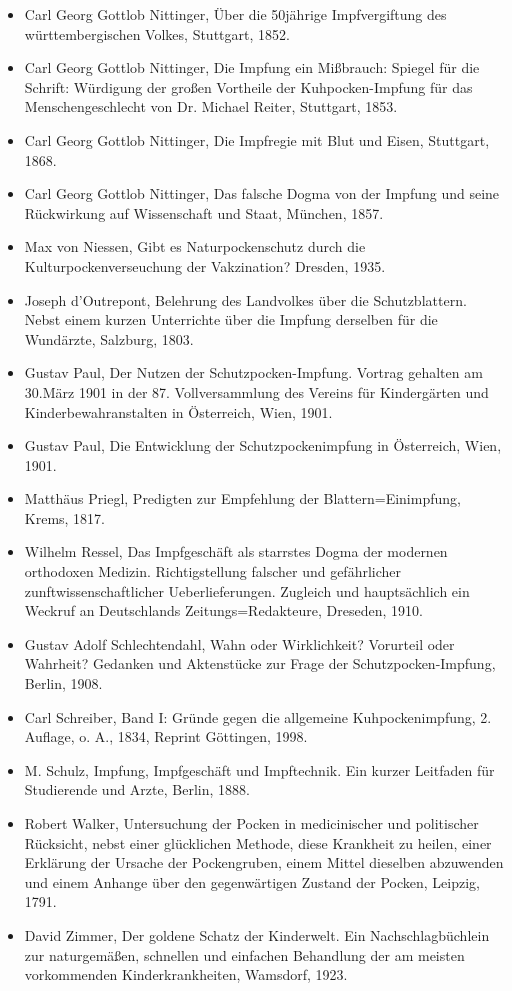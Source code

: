 \documentclass[
    a4paper,
    12pt,
    hyphens,
    chapterprefix=true,
    headheight=33pt,
    footheight=29pt,
    headings=optiontohead, %
]{scrartcl}
\begin{document}
{\begin{itemize}
\item{Carl Georg Gottlob Nittinger, Über die 50jährige Impfvergiftung des württembergischen Volkes, Stuttgart, 1852.}
\item{Carl Georg Gottlob Nittinger, Die Impfung ein Mißbrauch: Spiegel für die Schrift: Würdigung der großen Vortheile der Kuhpocken-Impfung für das Menschengeschlecht von Dr. Michael Reiter, Stuttgart, 1853.}
\item{Carl Georg Gottlob Nittinger, Die Impfregie mit Blut und Eisen, Stuttgart, 1868.}
\item{Carl Georg Gottlob Nittinger, Das falsche Dogma von der Impfung und seine Rückwirkung auf Wissenschaft und Staat, München, 1857.}
\item{Max von Niessen, Gibt es Naturpockenschutz durch die Kulturpockenverseuchung der Vakzination? Dresden, 1935.}
\item{Joseph d'Outrepont, Belehrung des Landvolkes über die Schutzblattern. Nebst einem kurzen Unterrichte über die Impfung derselben für die Wundärzte, Salzburg, 1803.}
\item{Gustav Paul, Der Nutzen der Schutzpocken-Impfung. Vortrag gehalten am 30.März 1901 in der 87. Vollversammlung des Vereins für Kindergärten und Kinderbewahranstalten in Österreich, Wien, 1901.}
\item{Gustav Paul, Die Entwicklung der Schutzpockenimpfung in Österreich, Wien, 1901.}
\item{Matthäus Priegl, Predigten zur Empfehlung der Blattern=Einimpfung, Krems, 1817.}
\item{Wilhelm Ressel, Das Impfgeschäft als starrstes Dogma der modernen orthodoxen Medizin. Richtigstellung falscher und gefährlicher zunftwissenschaftlicher Ueberlieferungen. Zugleich und hauptsächlich ein Weckruf an Deutschlands Zeitungs=Redakteure, Dreseden, 1910.}
\item{Gustav Adolf Schlechtendahl, Wahn oder Wirklichkeit? Vorurteil oder Wahrheit? Gedanken und Aktenstücke zur Frage der Schutzpocken-Impfung, Berlin, 1908.}
\item{Carl Schreiber, Band I: Gründe gegen die allgemeine Kuhpockenimpfung, 2. Auflage, o. A., 1834, Reprint Göttingen, 1998.}
\item{M. Schulz, Impfung, Impfgeschäft und Impftechnik. Ein kurzer Leitfaden für Studierende und Arzte, Berlin, 1888.}
\item{Robert Walker, Untersuchung der Pocken in medicinischer und politischer Rücksicht, nebst einer glücklichen Methode, diese Krankheit zu heilen, einer Erklärung der Ursache der Pockengruben, einem Mittel dieselben abzuwenden und einem Anhange über den gegenwärtigen Zustand der Pocken, Leipzig, 1791.}
\item{David Zimmer, Der goldene Schatz der Kinderwelt. Ein Nachschlagbüchlein zur naturgemäßen, schnellen und einfachen Behandlung der am meisten vorkommenden Kinderkrankheiten, Wamsdorf, 1923.}
\end{itemize}

}
\end{document}
